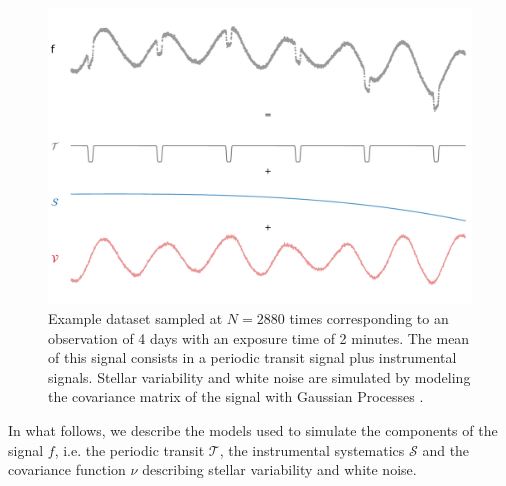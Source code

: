 \documentclass{aastex631}
\begin{document}
\begin{figure}[H]
    \begin{centering}
        \includegraphics[width=0.8\linewidth]{../figures/principle_dataset_decomposed.pdf}
        \caption{Example dataset sampled at $N=2880$ times corresponding to an observation of 4 days with an exposure time of 2 minutes. The mean of this signal consists in a periodic transit signal plus instrumental signals. Stellar variability and white noise are simulated by modeling the covariance matrix of the signal with Gaussian Processes .}
        \label{fig:app_principle_dataset}
    \end{centering}
\end{figure}
In what follows, we describe the models used to simulate the components of the signal $f$, i.e. the periodic transit $\mathcal{T}$, the instrumental systematics $\mathcal{S}$ and the covariance function $\nu$ describing stellar variability and white noise.
\end{document}
